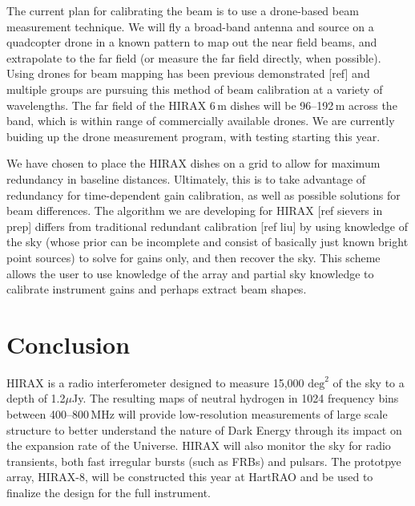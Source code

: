 \documentclass[]{spie}  %
\begin{document}
The current plan for calibrating the beam is to use a drone-based beam measurement technique. We will fly a broad-band antenna and source on a quadcopter drone in a known pattern to map out the near field beams, and extrapolate to the far field (or measure the far field directly, when possible). Using drones for beam mapping has been previous demonstrated [ref] and multiple groups are pursuing this method of beam calibration at a variety of wavelengths. The far field of the HIRAX 6\,m dishes will be 96--192\,m across the band, which is within range of commercially available drones. We are currently buiding up the drone measurement program, with testing starting this year.\newline

We have chosen to place the HIRAX dishes on a grid to allow for maximum redundancy in baseline distances. Ultimately, this is to take advantage of redundancy for time-dependent gain calibration, as well as possible solutions for beam differences. The algorithm we are developing for HIRAX [ref sievers in prep] differs from traditional redundant calibration [ref liu] by using knowledge of the sky (whose prior can be incomplete and consist of basically just known bright point sources) to solve for gains only, and then recover the sky. This scheme allows the user to use knowledge of the array and partial sky knowledge to calibrate instrument gains and perhaps extract beam shapes. \newline

\section{Conclusion}

HIRAX is a radio interferometer designed to measure 15,000 $\mathrm{deg}^{2}$ of the sky to a depth of 1.2$\mu$Jy. The resulting maps of neutral hydrogen in 1024 frequency bins between 400--800\,MHz will provide low-resolution measurements of large scale structure to better understand the nature of Dark Energy through its impact on the expansion rate of the Universe. HIRAX will also monitor the sky for radio transients, both fast irregular bursts (such as FRBs) and pulsars. The prototpye array, HIRAX-8, will be constructed this year at HartRAO and be used to finalize the design for the full instrument.

\label{sec:conc}
\end{document}
